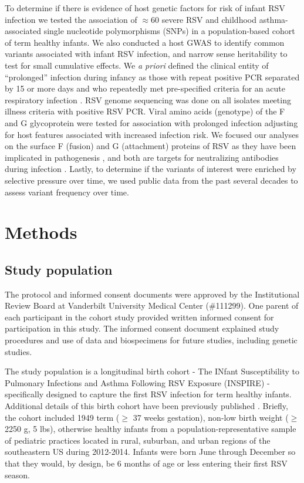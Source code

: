 \documentclass{article} %
\begin{document}
To determine if there is evidence of host genetic factors for risk of infant RSV infection we tested the association of $\approx 60$ severe RSV and childhood asthma-associated single nucleotide polymorphisms (SNPs) in a population-based cohort of term healthy infants.
We also conducted a host GWAS to identify common variants associated with infant RSV infection, and narrow sense heritability to test for small cumulative effects. 
We \textit{a priori} defined the clinical entity of ``prolonged'' infection during infancy as those with repeat positive PCR separated by 15 or more days and who repeatedly met pre-specified criteria for an acute respiratory infection
\citep{okiro2010duration}.
RSV genome sequencing was done on all isolates meeting illness criteria with positive RSV PCR. 
Viral amino acids (genotype) of the F and G glycoprotein were tested for association with prolonged infection adjusting for host features associated with increased infection risk. 
We focused our analyses on the surface F (fusion) and G (attachment) proteins of RSV as they have been implicated in pathogenesis \citep{boyoglu2015anti, bukreyev2012secreted}, 
and both are targets for neutralizing antibodies during infection
\citep{anderson1988neutralization, ngwuta2015prefusion}.
Lastly, to determine if the variants of interest were enriched by selective pressure over time, we used public data from the past several decades to assess variant frequency over time.

\section{Methods}
\subsection{Study population}
The protocol and informed consent documents were approved by the Institutional Review Board at Vanderbilt University Medical Center (\#111299).  
One parent of each participant in the cohort study provided written informed consent for participation in this study. 
The informed consent document explained study procedures and use of data and biospecimens for future studies, including genetic studies.

The study population is a longitudinal birth cohort - The INfant Susceptibility to Pulmonary Infections and Asthma Following RSV Exposure (INSPIRE) - specifically designed to capture the first RSV infection for term healthy infants. 
Additional details of this birth cohort have been previously published 
\citep{larkin_objectives_2015}.
Briefly, the cohort included 1949 term ($\ge$ 37 weeks gestation), non-low birth weight ($\ge$ 2250 g, 5 lbs), otherwise healthy infants from a population-representative sample of pediatric practices located in rural, suburban, and urban regions of the southeastern US during 2012-2014. 
Infants were born June through December so that they would, by design, be 6 months of age or less entering their first RSV season.
\end{document}
